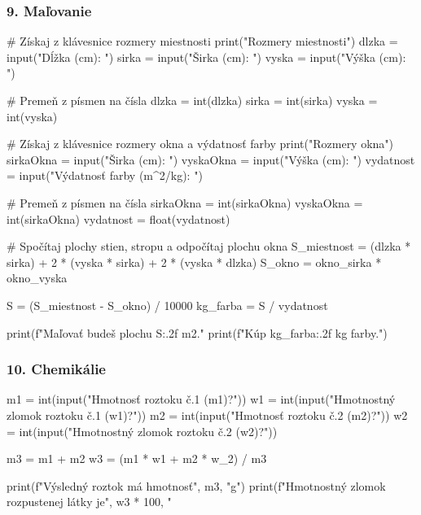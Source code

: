 \subsubsection*{9. Maľovanie}
\begin{solution}
# Získaj z klávesnice rozmery miestnosti
print("Rozmery miestnosti")
dlzka = input("Dĺžka (cm): ")
sirka = input("Širka (cm): ")
vyska = input("Výška (cm): ")

# Premeň z písmen na čísla
dlzka = int(dlzka)
sirka = int(sirka)
vyska = int(vyska)

# Získaj z klávesnice rozmery okna a výdatnosť farby
print("Rozmery okna")
sirkaOkna = input("Širka (cm): ")
vyskaOkna = input("Výška (cm): ")
vydatnost = input("Výdatnosť farby (m^2/kg): ")

# Premeň z písmen na čísla
sirkaOkna = int(sirkaOkna)
vyskaOkna = int(sirkaOkna)
vydatnost = float(vydatnost)

# Spočítaj plochy stien, stropu a odpočítaj plochu okna
S\_miestnost = (dlzka * sirka) + 2 * (vyska * sirka) + 2 * (vyska * dlzka)
S\_okno = okno\_sirka * okno\_vyska

S = (S\_miestnost - S\_okno) / 10000
kg\_farba = S / vydatnost

print(f"Maľovať budeš plochu {S:.2f} m2."
print(f"Kúp {kg\_farba:.2f} kg farby.")
\end{solution}

\subsubsection*{10. Chemikálie}
\begin{solution}
m1 = int(input("Hmotnosť roztoku č.1 (m1)?"))
w1 = int(input("Hmotnostný zlomok roztoku č.1 (w1)?"))
m2 = int(input("Hmotnosť roztoku č.2 (m2)?"))
w2 = int(input("Hmotnostný zlomok roztoku č.2 (w2)?"))

m3 = m1 + m2
w3 = (m1 * w1 + m2 * w_2) / m3

print(f"Výsledný roztok má hmotnosť", m3, "g")
print(f"Hmotnostný zlomok rozpustenej látky je", w3 * 100, "%
\end{solution}

